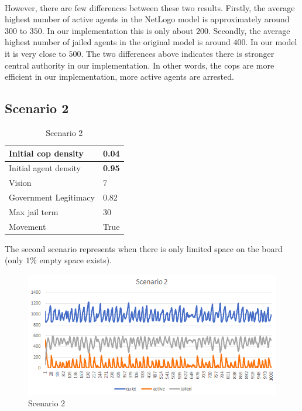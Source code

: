 \documentclass[11pt]{article}
\begin{document}
      \paragraph{}
      However, there are few differences between these two results. Firstly, the
      average highest number of active agents in the NetLogo model is approximately
      around $300$ to $350$. In our implementation this is only about $200$.
      Secondly, the average highest number of jailed agents in the original model
      is around $400$. In our model it is very close to $500$. The two differences
      above indicates there is stronger central authority in our implementation.
      In other words, the cops are more efficient in our implementation, more
      active agents are arrested.



      \subsection{Scenario 2}
      \begin{table}[ht]
        \begin{center}
          \begin{tabular}{|l|l|}
          \hline
            Initial cop density & 0.04 \\
          \hline
            Initial agent density & \textbf{0.95} \\
          \hline
            Vision & 7 \\
          \hline
            Government Legitimacy & 0.82 \\
          \hline
            Max jail term & 30 \\
          \hline
            Movement & True \\
          \hline
          \end{tabular}
          \caption{Scenario 2}\label{table2}
        \end{center}
      \end{table}
      The second scenario represents when there is only limited space on the board
      (only $1\%$ empty space exists).
      \begin{figure}[h!]
        \includegraphics[width=\linewidth]{Scenario_2.png}
        \caption{Scenario 2}
        \label{fig:scenario}
      \end{figure}
\end{document}
